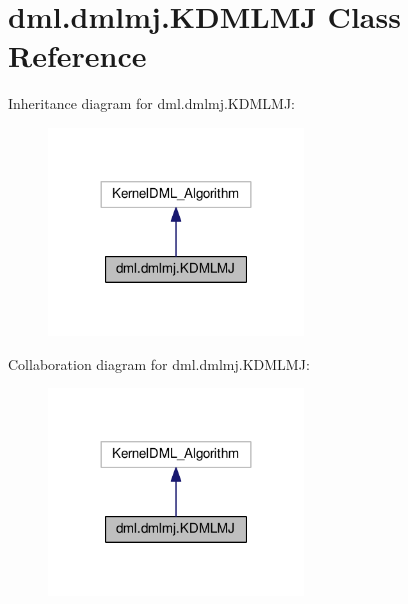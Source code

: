 \hypertarget{classdml_1_1dmlmj_1_1KDMLMJ}{}\section{dml.\+dmlmj.\+K\+D\+M\+L\+MJ Class Reference}
\label{classdml_1_1dmlmj_1_1KDMLMJ}


Inheritance diagram for dml.\+dmlmj.\+K\+D\+M\+L\+MJ\+:
\nopagebreak
\begin{figure}[H]
\begin{center}
\leavevmode
\includegraphics[width=192pt]{classdml_1_1dmlmj_1_1KDMLMJ__inherit__graph}
\end{center}
\end{figure}


Collaboration diagram for dml.\+dmlmj.\+K\+D\+M\+L\+MJ\+:
\nopagebreak
\begin{figure}[H]
\begin{center}
\leavevmode
\includegraphics[width=192pt]{classdml_1_1dmlmj_1_1KDMLMJ__coll__graph}
\end{center}
\end{figure}
